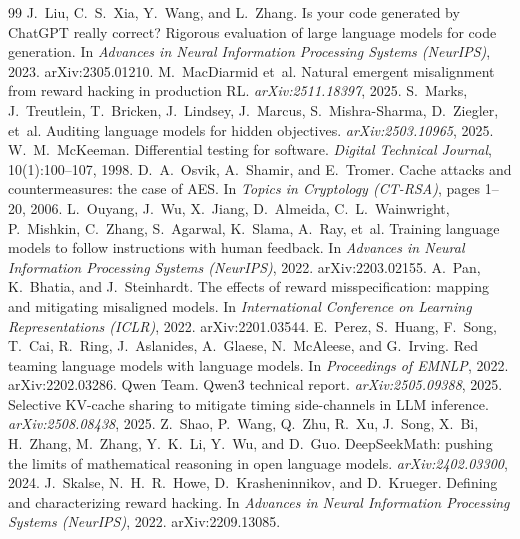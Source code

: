 \documentclass[10pt,twocolumn]{article}
\begin{document}
\begin{thebibliography}{99}
 J.~Liu, C.~S.~Xia, Y.~Wang, and L.~Zhang. Is your code generated by ChatGPT really correct? Rigorous evaluation of large language models for code generation. In \emph{Advances in Neural Information Processing Systems (NeurIPS)}, 2023. arXiv:2305.01210.
 M.~MacDiarmid et~al. Natural emergent misalignment from reward hacking in production RL. \emph{arXiv:2511.18397}, 2025.
 S.~Marks, J.~Treutlein, T.~Bricken, J.~Lindsey, J.~Marcus, S.~Mishra-Sharma, D.~Ziegler, et~al. Auditing language models for hidden objectives. \emph{arXiv:2503.10965}, 2025.
 W.~M.~McKeeman. Differential testing for software. \emph{Digital Technical Journal}, 10(1):100--107, 1998.
 D.~A.~Osvik, A.~Shamir, and E.~Tromer. Cache attacks and countermeasures: the case of AES. In \emph{Topics in Cryptology (CT-RSA)}, pages 1--20, 2006.
 L.~Ouyang, J.~Wu, X.~Jiang, D.~Almeida, C.~L.~Wainwright, P.~Mishkin, C.~Zhang, S.~Agarwal, K.~Slama, A.~Ray, et~al. Training language models to follow instructions with human feedback. In \emph{Advances in Neural Information Processing Systems (NeurIPS)}, 2022. arXiv:2203.02155.
 A.~Pan, K.~Bhatia, and J.~Steinhardt. The effects of reward misspecification: mapping and mitigating misaligned models. In \emph{International Conference on Learning Representations (ICLR)}, 2022. arXiv:2201.03544.
 E.~Perez, S.~Huang, F.~Song, T.~Cai, R.~Ring, J.~Aslanides, A.~Glaese, N.~McAleese, and G.~Irving. Red teaming language models with language models. In \emph{Proceedings of EMNLP}, 2022. arXiv:2202.03286.
 Qwen Team. Qwen3 technical report. \emph{arXiv:2505.09388}, 2025.
 Selective KV-cache sharing to mitigate timing side-channels in LLM inference. \emph{arXiv:2508.08438}, 2025.
 Z.~Shao, P.~Wang, Q.~Zhu, R.~Xu, J.~Song, X.~Bi, H.~Zhang, M.~Zhang, Y.~K.~Li, Y.~Wu, and D.~Guo. DeepSeekMath: pushing the limits of mathematical reasoning in open language models. \emph{arXiv:2402.03300}, 2024.
 J.~Skalse, N.~H.~R.~Howe, D.~Krasheninnikov, and D.~Krueger. Defining and characterizing reward hacking. In \emph{Advances in Neural Information Processing Systems (NeurIPS)}, 2022. arXiv:2209.13085.

\end{thebibliography}
\end{document}
